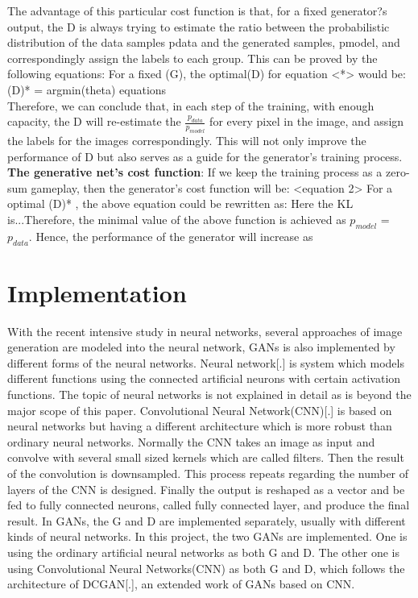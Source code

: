 \documentclass[10pt,twocolumn,letterpaper]{article}
\begin{document}
The advantage of this particular cost function is that, for a fixed generator?s output, the D is always trying to estimate the ratio between the probabilistic distribution of the data samples pdata and the generated samples, pmodel, and correspondingly assign the labels to each group. This can be proved by the following equations:
For a fixed (G), the optimal(D) for equation <*> would be:
 		(D)* = argmin(theta) equations ~\\
		
Therefore, we can conclude that, in each step of the training, with enough capacity, the D will re-estimate the $\frac{p_{data}}{p_{model}}$ for every pixel in the image, and assign the labels for the images correspondingly.  This will not only improve the performance of D but also serves as a guide for the generator's training process.\\

\textbf{The generative net's cost function}:
If we keep the training process as a zero-sum gameplay, then the generator's cost function will be:
<equation 2> 
For a optimal (D)* , the above equation could be rewritten as:
Here the KL is...Therefore, the minimal value of the above function is achieved as $p_{model}$ = $p_{data}$. Hence, the performance of the generator will increase as   

\section{Implementation}
With the recent intensive study in neural networks, several approaches of image generation are modeled into the neural network, GANs is also implemented by different forms of the neural networks. 
Neural network[.] is system which models different functions using the connected artificial neurons with certain activation functions. The topic of neural networks is not explained in detail as is beyond the major scope of this paper. Convolutional Neural Network(CNN)[.] is based on neural networks but having a different architecture which is more robust than ordinary neural networks. Normally the CNN takes an image as input and convolve with several small sized kernels which are called filters. Then the result of the convolution is downsampled. This process repeats regarding the number of layers of the CNN is designed. Finally the output is reshaped as a vector and be fed to fully connected neurons, called fully connected layer, and produce the final result.
In GANs, the G and D are implemented separately, usually with different kinds of neural networks. In this project, the two GANs are implemented. One is using the ordinary artificial neural networks as both G and D. The other one is using Convolutional Neural Networks(CNN) as both G and D, which follows the architecture of DCGAN[.], an extended work of GANs based on CNN.
\end{document}
